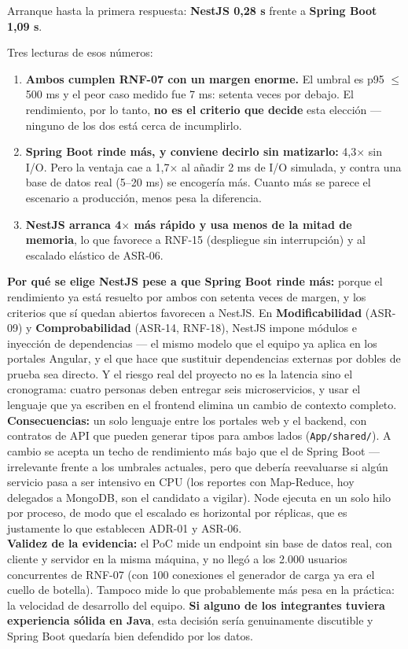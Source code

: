 \documentclass[11pt,a4paper]{article}
\begin{document}
Arranque hasta la primera respuesta: \textbf{NestJS 0,28 s} frente a \textbf{Spring Boot 1,09 s}.

Tres lecturas de esos números:
\begin{enumerate}
  \item \textbf{Ambos cumplen RNF-07 con un margen enorme.} El umbral es p95 $\leq$ 500 ms y el peor
  caso medido fue 7 ms: setenta veces por debajo. El rendimiento, por lo tanto, \textbf{no es el
  criterio que decide} esta elección --- ninguno de los dos está cerca de incumplirlo.
  \item \textbf{Spring Boot rinde más, y conviene decirlo sin matizarlo:} 4,3$\times$ sin I/O. Pero la
  ventaja cae a 1,7$\times$ al añadir 2 ms de I/O simulada, y contra una base de datos real (5--20 ms)
  se encogería más. Cuanto más se parece el escenario a producción, menos pesa la diferencia.
  \item \textbf{NestJS arranca 4$\times$ más rápido y usa menos de la mitad de memoria}, lo que
  favorece a RNF-15 (despliegue sin interrupción) y al escalado elástico de ASR-06.
\end{enumerate}

\textbf{Por qué se elige NestJS pese a que Spring Boot rinde más:} porque el rendimiento ya está
resuelto por ambos con setenta veces de margen, y los criterios que sí quedan abiertos favorecen a
NestJS. En \textbf{Modificabilidad} (ASR-09) y \textbf{Comprobabilidad} (ASR-14, RNF-18), NestJS
impone módulos e inyección de dependencias --- el mismo modelo que el equipo ya aplica en los
portales Angular, y el que hace que sustituir dependencias externas por dobles de prueba sea directo.
Y el riesgo real del proyecto no es la latencia sino el cronograma: cuatro personas deben entregar
seis microservicios, y usar el lenguaje que ya escriben en el frontend elimina un cambio de contexto
completo.\\
\textbf{Consecuencias:} un solo lenguaje entre los portales web y el backend, con contratos de API que
pueden generar tipos para ambos lados (\texttt{App/shared/}). A cambio se acepta un techo de
rendimiento más bajo que el de Spring Boot --- irrelevante frente a los umbrales actuales, pero que
debería reevaluarse si algún servicio pasa a ser intensivo en CPU (los reportes con Map-Reduce, hoy
delegados a MongoDB, son el candidato a vigilar). Node ejecuta en un solo hilo por proceso, de modo
que el escalado es horizontal por réplicas, que es justamente lo que establecen ADR-01 y ASR-06.\\
\textbf{Validez de la evidencia:} el PoC mide un endpoint sin base de datos real, con cliente y
servidor en la misma máquina, y no llegó a los 2.000 usuarios concurrentes de RNF-07 (con 100
conexiones el generador de carga ya era el cuello de botella). Tampoco mide lo que probablemente más
pesa en la práctica: la velocidad de desarrollo del equipo. \textbf{Si alguno de los integrantes
tuviera experiencia sólida en Java}, esta decisión sería genuinamente discutible y Spring Boot
quedaría bien defendido por los datos.
\end{document}
